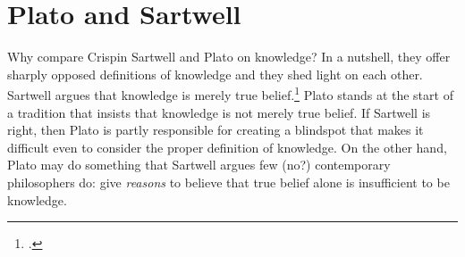 \section{Plato and Sartwell}

Why compare Crispin Sartwell and Plato on knowledge? In a nutshell, they offer sharply opposed definitions of knowledge and they shed light on each other. Sartwell argues that knowledge is merely true belief.\footcite{sartwell1991, sartwell1992} Plato stands at the start of a tradition that insists that knowledge is not merely true belief. If Sartwell is right, then Plato is partly responsible for creating a blindspot that makes it difficult even to consider the proper definition of knowledge. On the other hand, Plato may do something that Sartwell argues few (no?) contemporary philosophers do: give \textit{reasons} to believe that true belief alone is insufficient to be knowledge.

